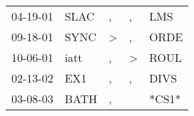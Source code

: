 \begin{supertabular}{p{0.07\textwidth}p{0.06\textwidth}p{0.02\textwidth}p{0.02\textwidth}p{0.06\textwidth}}
 04-19-01\textsuperscript{} &  SLAC\textsuperscript{} &             , &             , &   LMS\textsuperscript{} \\
 09-18-01\textsuperscript{} &  SYNC\textsuperscript{} &  \textgreater &             , &  ORDE\textsuperscript{} \\
 10-06-01\textsuperscript{} &  iatt\textsuperscript{} &             , &  \textgreater &  ROUL\textsuperscript{} \\
 02-13-02\textsuperscript{} &   EX1\textsuperscript{} &             , &             , &  DIVS\textsuperscript{} \\
 03-08-03\textsuperscript{} &  BATH\textsuperscript{} &             , &               &                   *CS1* \\
\end{supertabular}
